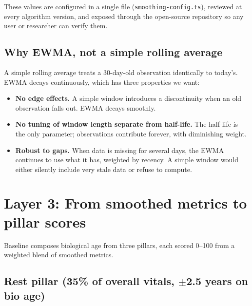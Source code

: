 \documentclass[11pt, a4paper]{article}
\begin{document}
These values are configured in a single file (\texttt{smoothing-config.ts}), reviewed at every algorithm version, and exposed through the open-source repository so any user or researcher can verify them.

\subsection{Why EWMA, not a simple rolling average}

A simple rolling average treats a 30-day-old observation identically to today's. EWMA decays continuously, which has three properties we want:

\begin{itemize}
  \item \textbf{No edge effects.} A simple window introduces a discontinuity when an old observation falls out. EWMA decays smoothly.
  \item \textbf{No tuning of window length separate from half-life.} The half-life is the only parameter; observations contribute forever, with diminishing weight.
  \item \textbf{Robust to gaps.} When data is missing for several days, the EWMA continues to use what it has, weighted by recency. A simple window would either silently include very stale data or refuse to compute.
\end{itemize}

\section{Layer 3: From smoothed metrics to pillar scores}

Baseline composes biological age from three pillars, each scored 0--100 from a weighted blend of smoothed metrics.

\subsection{Rest pillar (35\% of overall vitals, $\pm$2.5 years on bio age)}
\end{document}
